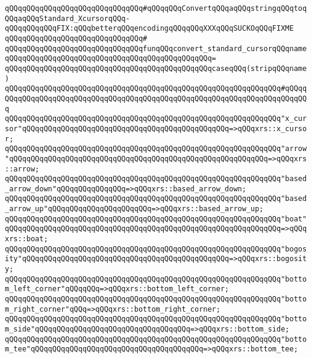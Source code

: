 \verb|qQQqqQQqqQQqqQQqqQQqqQQqqQQqqQQq#qQQqqQQqConvertqQQqaqQQqstringqQQqtoqQQqaqQQqStandard_XcursorqQQq-qQQqqQQqqQQqFIX:qQQqbetterqQQqencodingqQQqqQQqXXXqQQqSUCKOqQQqFIXME|\newline
\verb|qQQqqQQqqQQqqQQqqQQqqQQqqQQqqQQq#|\newline
\verb|qQQqqQQqqQQqqQQqqQQqqQQqqQQqqQQqfunqQQqconvert_standard_cursorqQQqname|\newline
\verb|qQQqqQQqqQQqqQQqqQQqqQQqqQQqqQQqqQQqqQQqqQQqqQQq=|\newline
\verb|qQQqqQQqqQQqqQQqqQQqqQQqqQQqqQQqqQQqqQQqqQQqqQQqcaseqQQq(stripqQQqname)|\newline
\verb|qQQqqQQqqQQqqQQqqQQqqQQqqQQqqQQqqQQqqQQqqQQqqQQqqQQqqQQqqQQqqQQq#qQQqqQQqqQQqqQQqqQQqqQQqqQQqqQQqqQQqqQQqqQQqqQQqqQQqqQQqqQQqqQQqqQQqqQQqqQQq|\newline
\verb|qQQqqQQqqQQqqQQqqQQqqQQqqQQqqQQqqQQqqQQqqQQqqQQqqQQqqQQqqQQqqQQq"x_cursor"qQQqqQQqqQQqqQQqqQQqqQQqqQQqqQQqqQQqqQQqqQQqqQQq=>qQQqxrs::x_cursor;|\newline
\verb|qQQqqQQqqQQqqQQqqQQqqQQqqQQqqQQqqQQqqQQqqQQqqQQqqQQqqQQqqQQqqQQq"arrow"qQQqqQQqqQQqqQQqqQQqqQQqqQQqqQQqqQQqqQQqqQQqqQQqqQQqqQQqqQQq=>qQQqxrs::arrow;|\newline
\verb|qQQqqQQqqQQqqQQqqQQqqQQqqQQqqQQqqQQqqQQqqQQqqQQqqQQqqQQqqQQqqQQq"based_arrow_down"qQQqqQQqqQQqqQQq=>qQQqxrs::based_arrow_down;|\newline
\verb|qQQqqQQqqQQqqQQqqQQqqQQqqQQqqQQqqQQqqQQqqQQqqQQqqQQqqQQqqQQqqQQq"based_arrow_up"qQQqqQQqqQQqqQQqqQQqqQQq=>qQQqxrs::based_arrow_up;|\newline
\verb|qQQqqQQqqQQqqQQqqQQqqQQqqQQqqQQqqQQqqQQqqQQqqQQqqQQqqQQqqQQqqQQq"boat"qQQqqQQqqQQqqQQqqQQqqQQqqQQqqQQqqQQqqQQqqQQqqQQqqQQqqQQqqQQqqQQq=>qQQqxrs::boat;|\newline
\verb|qQQqqQQqqQQqqQQqqQQqqQQqqQQqqQQqqQQqqQQqqQQqqQQqqQQqqQQqqQQqqQQq"bogosity"qQQqqQQqqQQqqQQqqQQqqQQqqQQqqQQqqQQqqQQqqQQqqQQq=>qQQqxrs::bogosity;|\newline
\verb|qQQqqQQqqQQqqQQqqQQqqQQqqQQqqQQqqQQqqQQqqQQqqQQqqQQqqQQqqQQqqQQq"bottom_left_corner"qQQqqQQq=>qQQqxrs::bottom_left_corner;|\newline
\verb|qQQqqQQqqQQqqQQqqQQqqQQqqQQqqQQqqQQqqQQqqQQqqQQqqQQqqQQqqQQqqQQq"bottom_right_corner"qQQq=>qQQqxrs::bottom_right_corner;|\newline
\verb|qQQqqQQqqQQqqQQqqQQqqQQqqQQqqQQqqQQqqQQqqQQqqQQqqQQqqQQqqQQqqQQq"bottom_side"qQQqqQQqqQQqqQQqqQQqqQQqqQQqqQQqqQQq=>qQQqxrs::bottom_side;|\newline
\verb|qQQqqQQqqQQqqQQqqQQqqQQqqQQqqQQqqQQqqQQqqQQqqQQqqQQqqQQqqQQqqQQq"bottom_tee"qQQqqQQqqQQqqQQqqQQqqQQqqQQqqQQqqQQqqQQq=>qQQqxrs::bottom_tee;|\newline
